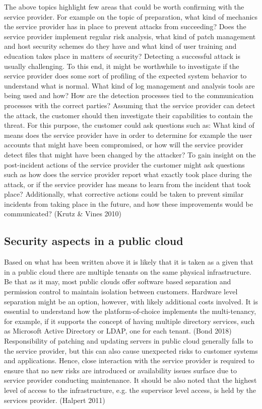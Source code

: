 \documentclass{article}
\begin{document}
The above topics highlight few areas that could be worth confirming with the service provider. For example on the topic of preparation, what kind of mechanics the service provider has in place to prevent attacks from succeeding? Does the service provider implement regular risk analysis, what kind of patch management and host security schemes do they have and what kind of user training and education takes place in matters of security? Detecting a successful attack is usually challenging. To this end, it might be worthwhile to investigate if the service provider does some sort of profiling of the expected system behavior to understand what is normal. What kind of log management and analysis tools are being used and how? How are the detection processes tied to the communication processes with the correct parties? Assuming that the service provider can detect the attack, the customer should then investigate their capabilities to contain the threat. For this purpose, the customer could ask questions such as: What kind of means does the service provider have in order to determine for example the user accounts that might have been compromised, or how will the service provider detect files that might have been changed by the attacker? To gain insight on the post-incident actions of the service provider the customer might ask questions such as how does the service provider report what exactly took place during the attack, or if the service provider has means to learn from the incident that took place? Additionally, what corrective actions could be taken to prevent similar incidents from taking place in the future, and how these improvements would be communicated? (Krutz \& Vines 2010)
\subsection{Security aspects in a public cloud}
Based on what has been written above it is likely that it is taken as a given that in a public cloud there are multiple tenants on the same physical infrastructure.
Be that as it may, most public clouds offer software based separation and permission control to maintain isolation between customers. Hardware level separation might be an option, however, with likely additional costs involved. It is essential to understand how the platform-of-choice implements the multi-tenancy, for example, if it supports the concept of having multiple directory services, such as Microsoft Active Directory or LDAP, one for each tenant. (Bond  2018)
Responsibility of patching and updating servers in public cloud generally falls to the service provider, but this can also cause unexpected risks to customer systems and applications. Hence, close interaction with the service provider is required to ensure that no new risks are introduced  or availability issues surface due to service provider conducting maintenance. 
It should be also noted that the highest level of access to the infrastructure, e.g. the supervisor level access, is held by the services provider. (Halpert 2011)
\end{document}
